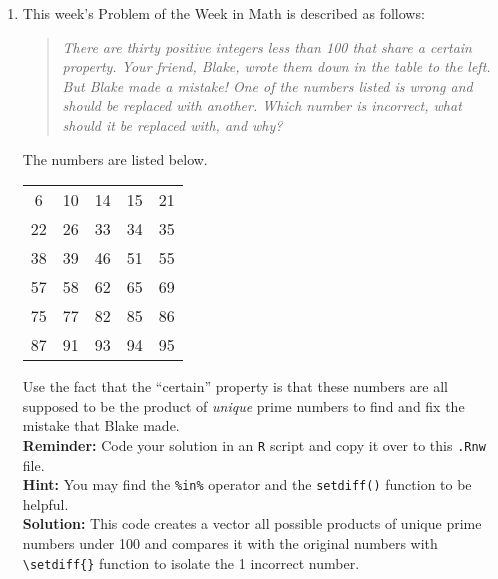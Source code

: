 \documentclass{article}\usepackage[]{graphicx}\usepackage[]{xcolor}
\begin{document}
\begin{enumerate}
\item This week's Problem of the Week in Math is described as follows:
\begin{quotation}
  \textit{There are thirty positive integers less than 100 that share a certain 
  property. Your friend, Blake, wrote them down in the table to the left. But 
  Blake made a mistake! One of the numbers listed is wrong and should be replaced 
  with another. Which number is incorrect, what should it be replaced with, and 
  why?}
\end{quotation}
The numbers are listed below.
\begin{center}
  \begin{tabular}{ccccc}
    6 & 10 & 14 & 15 & 21\\
    22 & 26 & 33 & 34 & 35\\
    38 & 39 & 46 & 51 & 55\\
    57 & 58 & 62 & 65 & 69\\
    75 & 77 & 82 & 85 & 86\\
    87 & 91 & 93 & 94 & 95
  \end{tabular}
\end{center}
Use the fact that the ``certain'' property is that these numbers are all supposed
to be the product of \emph{unique} prime numbers to find and fix the mistake that
Blake made.\\
\textbf{Reminder:} Code your solution in an \texttt{R} script and copy it over
to this \texttt{.Rnw} file.\\
\textbf{Hint:} You may find the \verb|%in%| operator and the \verb|setdiff()| function to be helpful.\\

\textbf{Solution:} 
This code creates a vector all possible products of unique prime numbers under 100 
and compares it with the original numbers with \verb|\setdiff{}| function to 
isolate the 1 incorrect number. 


\end{enumerate}
\end{document}
